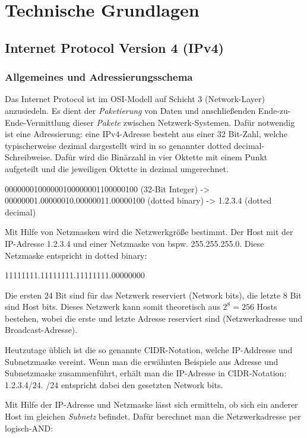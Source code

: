 \chapter{Technische Grundlagen} \label{Technische_Grundlagen}

\section{Internet Protocol Version 4 (IPv4)} \label{ipv4}
\subsection{Allgemeines und Adressierungsschema}
Das Internet Protocol ist im OSI-Modell auf Schicht 3 (Network-Layer) anzusiedeln. Es dient der \textit{Paketierung} von Daten und anschließenden Ende-zu-Ende-Vermittlung dieser \textit{Pakete} zwischen Netzwerk-Systemen. Dafür notwendig ist eine Adressierung: eine IPv4-Adresse besteht aus einer 32 Bit-Zahl, welche typischerweise dezimal dargestellt wird in so genannter \glqq dotted decimal\grqq{}-Schreibweise. Dafür wird die Binärzahl in vier Oktette mit einem Punkt aufgeteilt und die jeweiligen Oktette in dezimal umgerechnet.

00000001000000100000001100000100 (32-Bit Integer) ->  00000001.00000010.00000011.00000100 (dotted binary) -> 1.2.3.4 (dotted decimal)

Mit Hilfe von Netzmasken wird die Netzwerkgröße bestimmt. Der Host mit der IP-Adresse 1.2.3.4 und einer Netzmaske von bspw. 255.255.255.0. Diese Netzmaske entspricht in dotted binary:

11111111.11111111.11111111.00000000

Die ersten 24 Bit sind für das Netzwerk reserviert (Network bits), die letzte 8 Bit sind Host bits. Dieses Netzwerk kann somit theoretisch aus $2^8 = 256$ Hosts bestehen, wobei die erste und letzte Adresse reserviert sind (Netzwerkadresse und Broadcast-Adresse).

Heutzutage üblich ist die so genannte CIDR-Notation, welche IP-Addresse und Subnetzmaske vereint. Wenn man die erwähnten Beispiele aus Adresse und Subnetzmaske zusammenführt, erhält man die IP-Adresse in CIDR-Notation: 1.2.3.4/24. /24 entspricht dabei den gesetzten Network bits.

Mit Hilfe der IP-Adresse und Netzmaske lässt sich ermitteln, ob sich ein anderer Host im gleichen \textit{Subnetz} befindet. Dafür berechnet man die Netzwerkadresse per logisch-AND:

